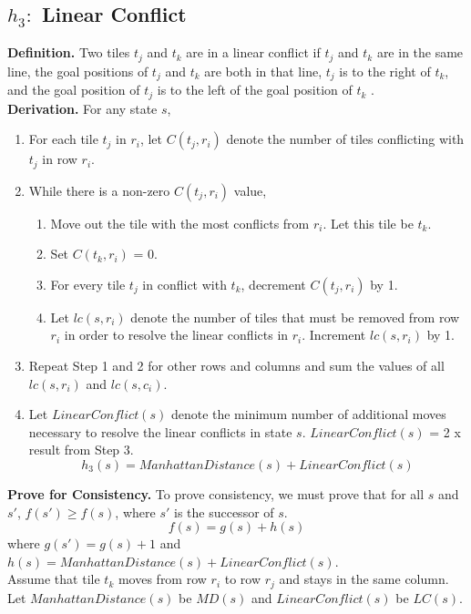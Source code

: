 \documentclass[runningheads]{llncs}
\begin{document}
\subsection{ \(h_3: \) Linear Conflict}
\textbf{Definition.} Two tiles \( t_j \) and \( t_k \) are in a linear conflict if \( t_j \) and \( t_k \) are in the same line, 
the goal positions of \( t_j \) and \( t_k \) are both in that line, 
\( t_j \) is to the right of \( t_k \), and the goal position of \( t_j \) is to the left of the goal position of \( t_k \) \cite[p13]{othar_hansson_generating_1985}. \\
\textbf{Derivation.} For any state \( s \),
\begin{enumerate}
    \item For each tile \( t_j \) in \( r_i \), let \( C(t_j, r_i) \) denote the number of tiles conflicting with \( t_j \) in row \( r_i \).
    \item While there is a non-zero \( C(t_j, r_i) \) value,
    \begin{enumerate}
        \item Move out the tile with the most conflicts from \( r_i \). Let this tile be \( t_k \).
        \item Set \( C(t_k, r_i) \) = 0.
        \item For every tile \( t_j \) in conflict with \( t_k \), decrement \( C(t_j, r_i) \) by 1.
        \item Let \( lc(s, r_i) \) denote the number of tiles that must be removed from row \( r_i \) in order to resolve the linear conflicts in \( r_i \). Increment \( lc(s, r_i) \) by 1.
    \end{enumerate}
    \item Repeat Step 1 and 2 for other rows and columns and sum the values of all \( lc (s, r_i) \) and \( lc(s, c_i) \).
    \item Let \( LinearConflict(s) \) denote the minimum number of additional moves necessary to resolve the linear conflicts in state \( s \). \( LinearConflict(s) \) = 2 x result from Step 3.
    \[
        h_3(s) = ManhattanDistance(s) + LinearConflict(s)
    \]
\end{enumerate}
\textbf{Prove for Consistency.} To prove consistency, we must prove that for all \( s \) and \( s' \), \( f(s') \geq f(s) \), where \( s' \) is the successor of \( s \).
\[
    f(s) = g(s) + h(s)
\]
where $g(s') = g(s) + 1$ and $h(s) = ManhattanDistance(s) + LinearConflict(s)$. \\
Assume that tile \( t_k \) moves from row \( r_i \) to row \( r_j \) and stays in the same column. Let \( ManhattanDistance(s) \) be \( MD(s) \) and \( LinearConflict(s) \) be \( LC(s) \). 
\end{document}
